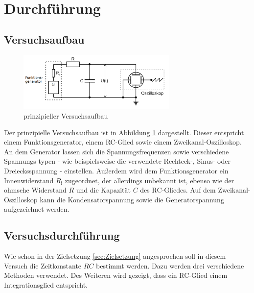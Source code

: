 \section{Durchführung}
\label{sec:Durchführung}

\subsection{Versuchsaufbau}
\label{sec:Versuchsaufbau}

\begin{figure}
	\caption{prinzipieller Versuchsaufbau}
	\label{fig:aufbauamk}
	\centering
	\includegraphics[width=0.7\textwidth]{bilder/generator.png}
\end{figure}

Der prinzipielle Versuchsaufbau ist in Abbildung \ref{fig:aufbauamk} dargestellt.
Dieser entspricht einem Funktionsgenerator, einem RC-Glied sowie einem Zweikanal-Oszilloskop.
An dem Generator lassen sich die Spannungsfrequenzen sowie verschiedene Spannungs
typen - wie beispielsweise die verwendete Rechteck-, Sinus- oder Dreiecksspannung - einstellen. Außerdem wird dem Funktionsgenerator ein Innenwiderstand $R_{\text{i}}$ zugeordnet, der allerdings unbekannt ist, ebenso wie der ohmsche Widerstand $R$ und die Kapazität $C$ des RC-Gliedes.
Auf dem Zweikanal-Oszilloskop kann die Kondensatorspannung sowie die Generatorspannung aufgezeichnet werden.

\subsection{Versuchsdurchführung}
\label{sec:Versuchsdurchführung}

Wie schon in der Zielsetzung \ref{sec:Zielsetzung} angesprochen soll in diesem Versuch die
Zeitkonstante $RC$ bestimmt werden.
Dazu werden drei verschiedene Methoden verwendet.
Des Weiteren wird gezeigt, dass ein RC-Glied einem Integrationsglied entspricht.

